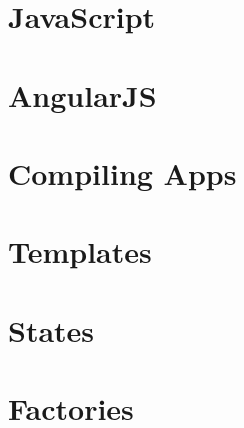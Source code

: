\section{JavaScript}

\section{AngularJS}

\section{Compiling Apps}

\section{Templates}

\section{States}

\section{Factories}